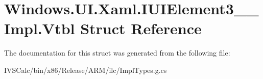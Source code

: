 \hypertarget{struct_windows_1_1_u_i_1_1_xaml_1_1_i_u_i_element3_____impl_1_1_vtbl}{}\section{Windows.\+U\+I.\+Xaml.\+I\+U\+I\+Element3\+\_\+\+\_\+\+Impl.\+Vtbl Struct Reference}
\label{struct_windows_1_1_u_i_1_1_xaml_1_1_i_u_i_element3_____impl_1_1_vtbl}


The documentation for this struct was generated from the following file\+:\begin{DoxyCompactItemize}
\item 
I\+V\+S\+Calc/bin/x86/\+Release/\+A\+R\+M/ilc/Impl\+Types.\+g.\+cs\end{DoxyCompactItemize}
